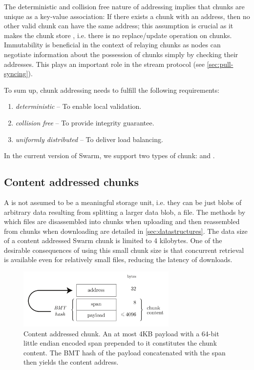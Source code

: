 The deterministic and collision free nature of addressing implies that chunks are unique as a key-value association: If there exists a chunk with an address, then no other valid chunk can have the same address; this assumption is crucial as it makes the chunk store , i.e. there is no replace/update operation on chunks. Immutability is beneficial in the context of relaying chunks as nodes can negotiate information about the possession of chunks simply by checking their addresses. This plays an important role in the stream protocol (see \ref{sec:pull-syncing}).

To sum up, chunk addressing needs to fulfill the following requirements:

\begin{enumerate}
    \item \emph{deterministic} -- To enable local validation.
    \item \emph{collision free} -- To provide integrity guarantee.
    \item \emph{uniformly distributed} -- To deliver load balancing.
\end{enumerate}

In the current version of Swarm, we support two types of chunk:  and . 

\subsection{Content addressed  chunks\statusgreen}\label{sec:content-addressed-chunks}

A  is not assumed to be a meaningful storage unit, i.e. they can be just blobs of arbitrary data resulting from splitting a larger data blob, a file. The methods by which files are disassembled into chunks when uploading and then reassembled from chunks when downloading are detailed in \ref{sec:datastructures}. The data size of a content addressed Swarm chunk is limited to 4 kilobytes. One of the desirable consequences of using this small chunk size is that concurrent retrieval is available even for relatively small files, reducing the latency of downloads. 

\begin{figure}[htbp]
   \centering
   \includegraphics[width=0.7\textwidth]{fig/content-addressed-chunk-2.pdf}
   \caption[Content addressed chunk\statusgreen]{Content addressed chunk. An at most 4KB payload with a 64-bit little endian encoded span prepended to it constitutes the chunk content. The BMT hash of the payload concatenated with the span then yields the content address.}
   \label{fig:content-addressed-chunk}
\end{figure}

